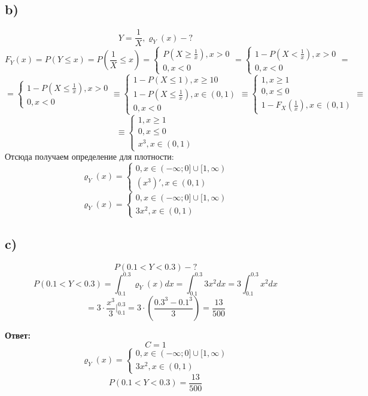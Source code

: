 \documentclass[a4paper,12pt]{article}
\begin{document}
\subsection*{b)}
\[
Y = \frac{1}{X}, \varrho_Y(x) - ?
\]
\[
F_Y(x) = P(Y \leq x) = P(\frac{1}{X} \leq x) = \begin{cases}
P(X \geq \frac{1}{x}) , x > 0\\
0, x < 0 
\end{cases} = \begin{cases}
1 - P(X < \frac{1}{x}) , x > 0\\
0, x < 0 
\end{cases} = 
\]
\[
=
\begin{cases}
1 - P(X \leq \frac{1}{x}) , x > 0\\
0, x < 0 
\end{cases} \equiv
\begin{cases}
1 - P(X \leq 1) , x \geq 1 0\\
1 - P(X \leq \frac{1}{x}), x \in (0, 1)\\
0, x < 0
\end{cases} \equiv
\begin{cases}
1 , x \geq 1 \\
0 , x \leq 0  \\
1 - F_X(\frac{1}{x}), x \in (0, 1)
\end{cases}
\equiv 
\]
\[
\equiv
\begin{cases}
1 , x \geq 1 \\
0 , x \leq 0  \\ 
x^3, x \in (0, 1)
\end{cases}
\]
Отсюда получаем определение для плотности:
\[
\varrho_Y(x) = \begin{cases}
0, x \in (-\infty; 0] \cup [1, \infty) \\
(x^3)', x \in (0, 1)
\end{cases}
\]
\[
\varrho_Y(x) = \begin{cases}
0, x \in (-\infty; 0] \cup [1, \infty) \\
3x^2, x \in (0, 1)
\end{cases}
\]
\subsection*{c)}
\[
P(0.1 < Y < 0.3) - ?
\]
\[
P(0.1 < Y < 0.3)  = \int_{0.1}^{0.3} \varrho_Y(x) dx = \int_{0.1}^{0.3} 3x^2 dx = 3 \int_{0.1}^{0.3} x^2 dx
\]
\[
= 3 \cdot \frac{x^3}{3} \Bigg|^{0.3}_{0.1} = 3 \cdot \left(\frac{0.3^3 - 0.1^3}{3}\right) = \frac{13}{500}
\]
\begin{center}
\textbf{Ответ: } 
\[
C = 1
\]
\[
\varrho_Y(x) = \begin{cases}
0, x \in (-\infty; 0] \cup [1, \infty) \\
3x^2, x \in (0, 1)
\end{cases}
\]
\[
P(0.1 < Y < 0.3) = \frac{13}{500}
\]
\end{center}
\end{document}
